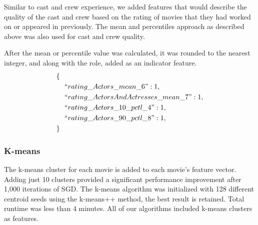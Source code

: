 \documentclass[journal]{IEEEtran}
\begin{document}
Similar to cast and crew experience, we added features that would describe the quality of the cast and crew based on the rating of movies that they had worked on or appeared in previously.  The mean and percentiles approach as described above was also used for cast and crew quality.
\begin{center}
\end{center}

After the mean or percentile value was calculated, it was rounded to the nearest integer, and along with the role, added as an indicator feature.
\begin{align*}
        \{\ \ &\\
        &``rating\_Actors\_mean\_6": 1,\\
        &``rating\_ActorsAndActresses\_mean\_7": 1,\\
        &``rating\_Actors\_10\_pctl\_4": 1,\\
        &``rating\_Actors\_90\_pctl\_8": 1,\\
        \}\ \ &
\end{align*}

\subsubsection{K-means}
The k-means cluster for each movie is added to each movie's feature vector.
Adding just 10 clusters provided a significant performance improvement after
1,000 iterations of SGD.  The k-means algorithm was initialized with 128 different
centroid seeds using the k-means++ method, the best result is retained.  Total
runtime was less than 4 minutes.  All of our algorithms included k-means clusters as features.
\end{document}
